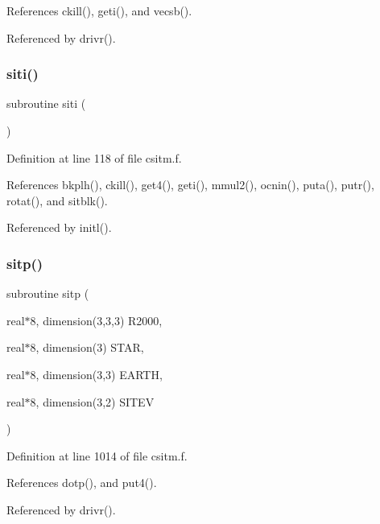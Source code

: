 References ckill(), geti(), and vecsb().



Referenced by drivr().

\mbox{\label{csitm_8f_aa9d490db42c8398a747838ceed61e6d4}} 
\subsubsection{\texorpdfstring{siti()}{siti()}}
{\footnotesize\ttfamily subroutine siti (\begin{DoxyParamCaption}{ }\end{DoxyParamCaption})}



Definition at line 118 of file csitm.\+f.



References bkplh(), ckill(), get4(), geti(), mmul2(), ocnin(), puta(), putr(), rotat(), and sitblk().



Referenced by initl().

\mbox{\label{csitm_8f_a00ed5e4e02b263376d7c95b892957e3c}} 
\subsubsection{\texorpdfstring{sitp()}{sitp()}}
{\footnotesize\ttfamily subroutine sitp (\begin{DoxyParamCaption}\item[{real$\ast$8, dimension(3,3,3)}]{R2000,  }\item[{real$\ast$8, dimension(3)}]{S\+T\+AR,  }\item[{real$\ast$8, dimension(3,3)}]{E\+A\+R\+TH,  }\item[{real$\ast$8, dimension(3,2)}]{S\+I\+T\+EV }\end{DoxyParamCaption})}



Definition at line 1014 of file csitm.\+f.



References dotp(), and put4().



Referenced by drivr().

